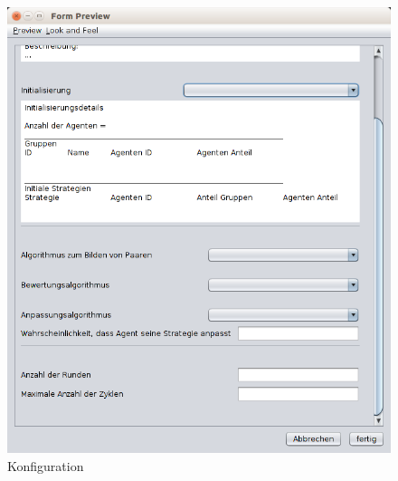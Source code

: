 \begin{figure}[hp] 
  \centering
     \includegraphics[width=1.0\textwidth]{GUI_Entwurf/NeueKonfiguration2.png}
  \caption{Konfiguration}
  \label{fig:Bild2}
\end{figure}

